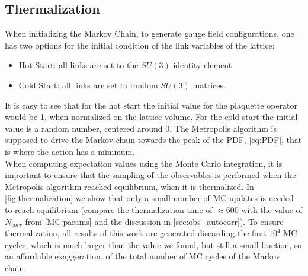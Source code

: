 \subsection{Thermalization}
\label{sec:thermalization}
When initializing the Markov Chain, to generate gauge field configurations, one has two options for the initial condition of the link variables of the lattice:
\begin{itemize}
    \item Hot Start: all links are set to the $SU(3)$ identity element
    \item Cold Start: all links are set to random $SU(3)$ matrices.
\end{itemize}
It is easy to see that for the hot start the initial value for the plaquette operator would be 1, when normalized on the lattice volume. For the cold start the initial value is a random number, centered around 0. The Metropolis algorithm is supposed to drive the Markov chain towards the peak of the PDF, \cref{eq:PDF}, that is where the action has a minimum. \\
When computing expectation values using the Monte Carlo integration, it is important to ensure that the sampling of the observables is performed when the Metropolis algorithm reached equilibrium, when it is thermalized. In \cref{fig:thermalization} we show that only a small number of MC updates is needed to reach equilibrium (compare the thermalization time of $\approx 600$ with the value of $N_{corr}$ from \cref{MC:params} and the discussion in \cref{sec:obs_autocorr}). 
To ensure thermalization, all results of this work are generated discarding the first $10^4$ MC cycles, which is much larger than the value we found, but still a small fraction, so an affordable exaggeration, of the total number of MC cycles of the Markov chain.


